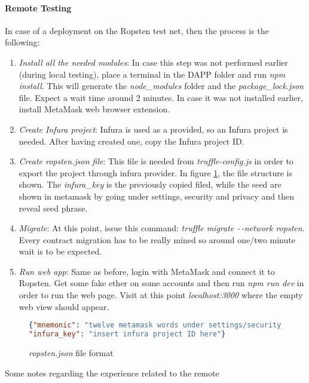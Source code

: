 \documentclass[11pt, a4paper]{report}
\begin{document}
	\paragraph*{Remote Testing}
	In case of a deployment on the Ropsten test net, then the process is the following:
	\begin{enumerate}
		\item \emph{Install all the needed modules}: In case this step was not performed earlier (during local testing), place a terminal in the DAPP folder and run \emph{npm install}. This will generate the \emph{node\_modules} folder and the \emph{package\_lock.json} file. Expect a wait time around 2 minutes. In case it was not installed earlier, install MetaMask web browser extension.
		\item \emph{Create Infura project}: Infura is used as a provided, so an Infura project is needed. After having created one, copy the Infura project ID.
		\item \emph{Create ropsten.json file}: This file is needed from \emph{truffle-config.js} in order to export the project through infura provider. In figure \ref{fig:ropsten}, the file structure is shown. The \emph{infura\_key} is the previously copied filed, while the seed are shown in metamask by going under settings, security and privacy and then reveal seed phrase.
		\item \emph{Migrate}: At this point, issue this command: \emph{truffle migrate -\,-network ropsten}. Every contract migration has to be really mined so around one/two minute wait is to be expected.
		\item \emph{Run web app}: Same as before, login with MetaMask and connect it to Ropsten. Get some fake ether on some accounts and then run \emph{npm run dev} in order to run the web page. Visit at this point \emph{localhost:3000} where the empty web view should appear.
	\end{enumerate}
	\begin{figure}
		\begin{lstlisting}[language=json,firstnumber=1]
{"mnemonic": "twelve metamask words under settings/security_and_privacy/reveal_seed_phrase",
"infura_key": "insert infura project ID here"}
		\end{lstlisting}
		\caption{\emph{ropsten.json} file format}
		\label{fig:ropsten}
	\end{figure}

	Some notes regarding the experience related to the remote 
	
\end{document}
